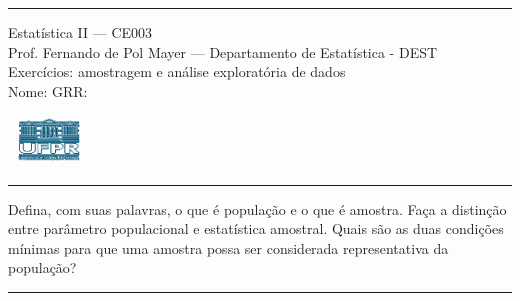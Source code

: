 \documentclass[a4paper,11pt,fleqn]{article}\usepackage[]{graphicx}\usepackage[]{color}
\theoremstyle{definition}
\begin{document}
\reversemarginpar %





\hrule
\vspace{0.3cm}

\begin{minipage}[c]{.85\textwidth}
  Estatística II --- CE003 \\
  Prof. Fernando de Pol Mayer --- Departamento de Estatística - DEST \\
  Exercícios: amostragem e análise exploratória de dados \\
  Nome:  \hfill GRR: \hspace{2cm}
\end{minipage}\hfill
\begin{minipage}[c]{.15\textwidth}
\flushright
\includegraphics[width=2.2cm]{../img/ufpr-logo.png}
\end{minipage}

\vspace{0.3cm}
\hrule
\vspace{0.3cm}

\begin{compactenum}[1.]
\item Defina, com suas palavras, o que é população e o que é
  amostra. Faça a distinção entre parâmetro populacional e estatística
  amostral. Quais são as duas condições mínimas para que uma amostra
  possa ser considerada representativa da população?
\end{compactenum}

\vspace{0.3cm}
\hrule
\vspace{0.3cm}
\end{document}
